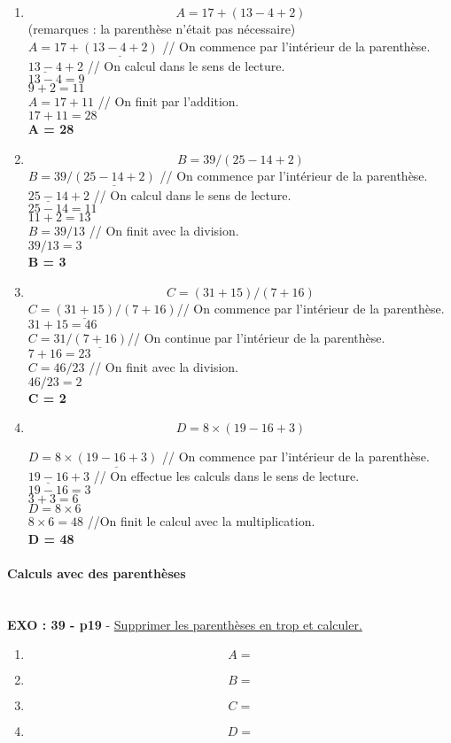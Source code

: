 \documentclass[11pt]{article}
\begin{document}
\begin{enumerate}
\item $$A = 17 + (13 - 4 + 2)$$
  (remarques : la parenthèse n'était pas nécessaire)\\
  $A = 17 + \underline{(13 - 4 + 2)}$ // On commence par l'intérieur de la parenthèse.\\
  $\underline{13 - 4} + 2$ // On calcul dans le sens de lecture.\\
  $13 - 4 = 9$\\
  $9 + 2 = 11$\\
  $A = 17 + 11$ // On finit par l'addition.\\
  $17 + 11 = 28$\\
  \textbf{A = 28}\\

\item $$B = 39 / (25 - 14 + 2)$$
  $B = 39 / \underline{(25 - 14 + 2)}$ // On commence par l'intérieur de la parenthèse.\\
  $\underline{25 - 14} + 2$ // On calcul dans le sens de lecture.\\
  $25 - 14 = 11$\\
  $11 + 2 = 13$\\
  $B = 39/13$ // On finit avec la division.\\
  $39/13 = 3$\\
  \textbf{B = 3}\\

\item $$C = (31 + 15)/(7 + 16)$$
  $C =\underline{(31 + 15)}/(7 + 16)$// On commence par l'intérieur de la parenthèse.\\
  $31 + 15 = 46$\\ 
  $C =31/ \underline{(7 + 16)}$// On continue par l'intérieur de la parenthèse.\\
  $7 + 16 = 23$\\
  $C = 46 / 23$ // On finit avec la division.\\
  $46 / 23 = 2$\\
  \textbf{C = 2}

\item $$D = 8 \times (19 - 16 + 3)$$

  $D = 8 \times \underline{(19 - 16 + 3)}$ // On commence par l'intérieur de la parenthèse.\\
  $\underline{19 - 16} + 3$ // On effectue les calculs dans le sens de lecture.\\
  $19 - 16 = 3$\\
  $3 + 3 = 6$\\
  $D = 8 \times 6$\\
  $8 \times 6 = 48$ //On finit le calcul avec la multiplication. \\
  \textbf{D = 48}\\
  
\end{enumerate}

\paragraph{Calculs avec des parenthèses}~~\\

\textbf{EXO : 39 - p19} - \underline{Supprimer les parenthèses en trop et calculer.}
\begin{enumerate}
\item $$A = $$
\item $$B = $$
\item $$C = $$
\item $$D = $$
\end{enumerate}
\end{document}
